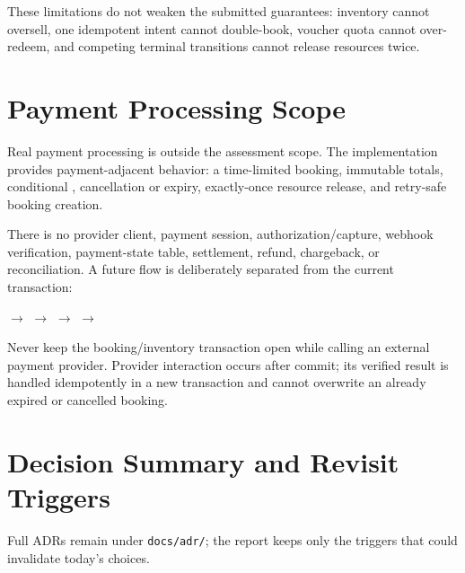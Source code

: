 These limitations do not weaken the submitted guarantees: inventory cannot
oversell, one idempotent intent cannot double-book, voucher quota cannot
over-redeem, and competing terminal transitions cannot release resources twice.

\section{Payment Processing Scope}
Real payment processing is outside the assessment scope. The implementation
provides payment-adjacent behavior: a time-limited  booking,
immutable totals, conditional , cancellation or
expiry, exactly-once resource release, and retry-safe booking creation.

There is no provider client, payment session, authorization/capture, webhook
verification, payment-state table, settlement, refund, chargeback, or
reconciliation. A future flow is deliberately separated from the current
transaction:

\begin{center}
\small
{} $\rightarrow$
 $\rightarrow$
 $\rightarrow$
 $\rightarrow$
\end{center}

\begin{decisionbox}
Never keep the booking/inventory transaction open while calling an external
payment provider. Provider interaction occurs after commit; its verified result
is handled idempotently in a new transaction and cannot overwrite an already
expired or cancelled booking.
\end{decisionbox}

\section{Decision Summary and Revisit Triggers}
Full ADRs remain under \nolinkurl{docs/adr/}; the report keeps only the triggers
that could invalidate today's choices.

